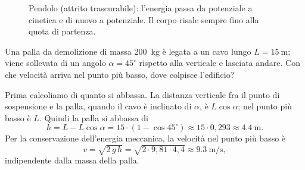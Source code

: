 \begin{figure}[!htbp]
    \centering
    \caption{Pendolo (attrito trascurabile): l'energia passa da potenziale a cinetica e di nuovo a potenziale. Il corpo risale sempre fino alla quota di partenza.}
    \label{fig:pendolo-energia}
\end{figure}

\begin{testexample}
Una palla da demolizione di massa \SI{200}{\kilo\gram} è legata a un cavo lungo $L = \SI{15}{\metre}$; viene sollevata di un angolo $\alpha = 45^\circ$ rispetto alla verticale e lasciata andare. Con che velocità arriva nel punto più basso, dove colpisce l'edificio?

Prima calcoliamo di quanto si abbassa. La distanza verticale fra il punto di sospensione e la palla, quando il cavo è inclinato di $\alpha$, è $L\cos\alpha$; nel punto più basso è $L$. Quindi la palla si abbassa di
\[ h = L - L\cos\alpha = 15 \cdot (1 - \cos 45^\circ) \approx 15 \cdot 0{,}293 \approx \SI{4,4}{\metre}. \]
Per la conservazione dell'energia meccanica, la velocità nel punto più basso è
\[ v = \sqrt{2\,g\,h} = \sqrt{2 \cdot 9{,}81 \cdot 4{,}4} \approx \SI{9,3}{\metre\per\second}, \]
indipendente dalla massa della palla.
\end{testexample}

